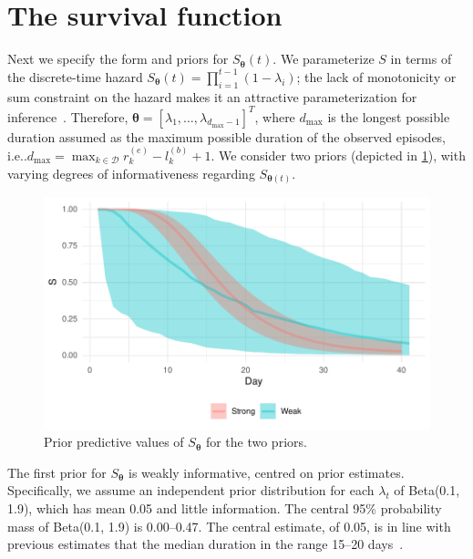 \documentclass[12pt]{article}
\makeatletter
\newcommand\set{\mathcal}
\renewcommand{\vec}[1]{\bm{#1}}
\newcommand{\dmax}{d_\text{max}}
\DeclareRobustCommand\onedot{\futurelet\@let@token\@onedot}
\def\@onedot{\ifx\@let@token.\else.\null\fi\xspace}
\def\ie{i.e\onedot} \def\Ie{{I.e}\onedot}
\makeatother
\begin{document}
\section{The survival function} \label{sec:parameters-priors}

Next we specify the form and priors for $S_{\vec{\theta}}(t)$.
We parameterize $S$ in terms of the discrete-time hazard $S_{\vec{\theta}}(t) = \prod_{i=1}^{t-1} (1 - \lambda_{i})$; the lack of monotonicity or sum constraint on the hazard makes it an attractive parameterization for inference~\citep{heBayesian}.
Therefore, $\vec{\theta} = [\lambda_1, \dots, \lambda_{\dmax-1}]^T$, where $\dmax$ is the longest possible duration assumed as the maximum possible duration of the observed episodes, \ie $\dmax = \max_{k \in \set{D}} r^{(e)}_k - l^{(b)}_k + 1$.
We consider two priors (depicted in \cref{fig:priors}), with varying degrees of informativeness regarding $S_{\vec{\theta}(t)}$.
\begin{figure}
  \includegraphics{figures/output/prior_predictive_survival}
  \caption{%
    Prior predictive values of $S_{\vec{\theta}}$ for the two priors.
  }
  \label{fig:priors}
\end{figure}

The first prior for $S_{\vec{\theta}}$ is weakly informative, centred on prior estimates.
Specifically, we assume an independent prior distribution for each $\lambda_t$ of Beta(0.1, 1.9), which has mean 0.05 and little information.
The central 95\% probability mass of Beta(0.1, 1.9) is 0.00--0.47.
The central estimate, of 0.05, is in line with previous estimates that the median duration in the range 15--20 days~\citep{cevikShedding}.
\end{document}
